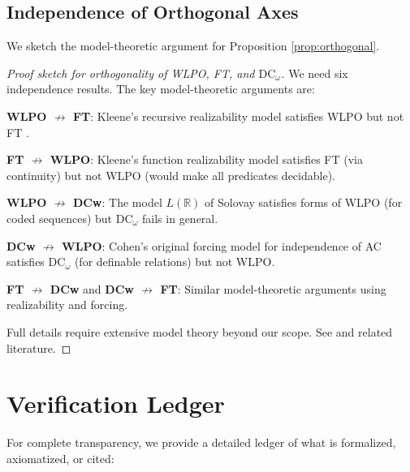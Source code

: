 \documentclass[11pt]{article}
\theoremstyle{plain}
\theoremstyle{definition}
\newcommand{\R}{\mathbb{R}}
\newcommand{\DCw}{\mathrm{DC}_\omega}
\begin{document}
\subsection{Independence of Orthogonal Axes}

We sketch the model-theoretic argument for Proposition \ref{prop:orthogonal}.

\begin{proof}[Proof sketch for orthogonality of WLPO, FT, and $\DCw$]
We need six independence results. The key model-theoretic arguments are:

\textbf{WLPO $\not\rightarrow$ FT}: Kleene's recursive realizability model satisfies WLPO but not FT \cite{vanDalen1997}.

\textbf{FT $\not\rightarrow$ WLPO}: Kleene's function realizability model satisfies FT (via continuity) but not WLPO (would make all predicates decidable).

\textbf{WLPO $\not\rightarrow$ DCw}: The model $L(\R)$ of Solovay satisfies forms of WLPO (for coded sequences) but $\DCw$ fails in general.

\textbf{DCw $\not\rightarrow$ WLPO}: Cohen's original forcing model for independence of AC satisfies $\DCw$ (for definable relations) but not WLPO.

\textbf{FT $\not\rightarrow$ DCw} and \textbf{DCw $\not\rightarrow$ FT}: Similar model-theoretic arguments using realizability and forcing.

Full details require extensive model theory beyond our scope. See \cite{bridges2007} and related literature.
\end{proof}

\section{Verification Ledger}\label{app:verification}

For complete transparency, we provide a detailed ledger of what is formalized, axiomatized, or cited:
\end{document}
